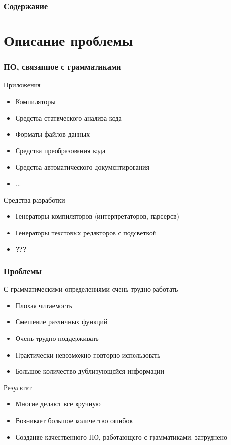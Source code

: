 \documentclass[paper=screen,10pt,unicode]{beamer}
\author{Андрей Бреслав \\ \texttt{abreslav@gmail.com}}
\institute[ИТМО]{СПбГУ ИТМО}
\title[Grammarware Engineering]{\mytitle}
\date{\today}
\begin{document}
\begin{frame}
	\titlepage
\end{frame}

\begin{frame}
	\frametitle{Содержание}
	\tableofcontents
\end{frame}

\section{Описание проблемы}
\begin{frame}
	\frametitle{ПО, связанное с грамматиками}
	\begin{block}{Приложения}
		\begin{itemize}
			\item Компиляторы
			\item Средства статического анализа кода
			\item Форматы файлов данных
			\item Средства преобразования кода
			\item Средства автоматического документирования
			\item ...
		\end{itemize}
	\end{block}
	\begin{block}{Средства разработки}
		\begin{itemize}
			\item Генераторы компиляторов (интерпретаторов, парсеров)
			\item Генераторы текстовых редакторов с подсветкой
			\item \large \bf\alert{???}
		\end{itemize}
	\end{block}
\end{frame}

\begin{frame}
	\frametitle{Проблемы}

	\begin{block}{С грамматическими определениями очень трудно работать}
		\begin{itemize}
			\item Плохая читаемость
			\item Смешение различных функций
			\item Очень трудно поддерживать
			\item Практически невозможно повторно использовать
			\item Большое количество дублирующейся информации
		\end{itemize}
	\end{block}
	\begin{block}{Результат}
		\begin{itemize}
			\item Многие делают все вручную
			\item Возникает большое количество ошибок
			\item Создание качественного ПО, работающего с грамматиками, затруднено
		\end{itemize}
	\end{block}
\end{frame}
\end{document}
